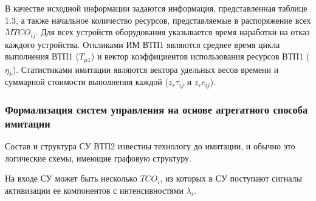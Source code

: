 В качестве исходной информации задаются информация, представленная таблице 1.3, а также начальное количество ресурсов, представляемые в распоряжение всех $MTCO_{ij}$. Для всех устройств оборудования указывается время наработки на отказ каждого устройства. Откликами ИМ ВТП1 являются среднее время цикла выполнения ВТП1 ($T_{\mu 1}$) и вектор коэффициентов использования ресурсов ВТП1 ($\eta_{k}$). Статистиками имитации являются вектора удельных весов времени и суммарной стоимости выполнения каждой   ({$z_r \tau_{ij}$} и {$z_rc_{ij}$}).


\subsubsection{Формализация систем управления на основе агрегатного способа имитации}

Состав и структура СУ ВТП2 известны технологу до имитации, и обычно это логические схемы, имеющие графовую структуру.

На входе СУ может быть несколько  $TCO_i$, из которых в СУ поступают сигналы активизации ее компонентов с интенсивностями $\lambda_i$.


